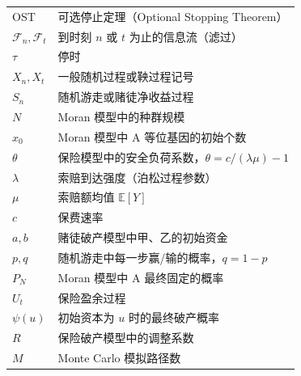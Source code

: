 
\begin{nomenclature}
\label{chap:symb}

\begin{longtable}{p{}p{}}
OST & 可选停止定理（Optional Stopping Theorem） \\
$\mathcal{F}_n,\mathcal{F}_t$ & 到时刻 $n$ 或 $t$ 为止的信息流（滤过） \\
$\tau$ & 停时 \\
$X_n, X_t$ & 一般随机过程或鞅过程记号 \\
$S_n$ & 随机游走或赌徒净收益过程 \\
$N$ & Moran 模型中的种群规模 \\
$x_0$ & Moran 模型中 A 等位基因的初始个数 \\
$\theta$ & 保险模型中的安全负荷系数，$\theta = c/(\lambda\mu)-1$ \\
$\lambda$ & 索赔到达强度（泊松过程参数） \\
$\mu$ & 索赔额均值 $\mathbb{E}[Y]$ \\
$c$ & 保费速率 \\
$a, b$ & 赌徒破产模型中甲、乙的初始资金 \\
$p, q$ & 随机游走中每一步赢/输的概率，$q = 1-p$ \\
$P_N$ & Moran 模型中 A 最终固定的概率 \\
$U_t$ & 保险盈余过程 \\
$\psi(u)$ & 初始资本为 $u$ 时的最终破产概率 \\
$R$ & 保险破产模型中的调整系数 \\
$M$ & Monte Carlo 模拟路径数 \\
\end{longtable}

\end{nomenclature}
